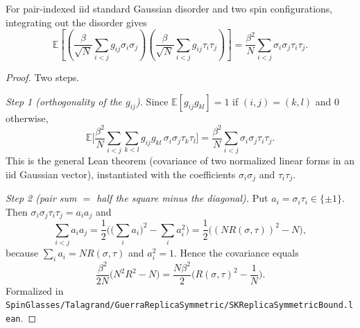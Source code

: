 \begin{lemma}\label{lem:sg-tal:pair-covariance}
  \leanok
{}
For pair-indexed iid standard Gaussian disorder and two spin configurations, integrating out the
disorder gives
\[
\mathbb{E}\left[\left(\frac{\beta}{\sqrt{N}}\sum_{i<j}
  g_{ij}\sigma_i\sigma_j\right)
  \left(\frac{\beta}{\sqrt{N}}\sum_{i<j}
  g_{ij}\tau_i\tau_j\right)\right]
= \frac{\beta^2}{N}\sum_{i<j}\sigma_i\sigma_j\tau_i\tau_j.
\]
\end{lemma}
\begin{proof}
  \leanok
Two steps.

\emph{Step 1 (orthogonality of the $g_{ij}$).} Since $\mathbb{E}[g_{ij}g_{kl}]=1$ if $(i,j)=(k,l)$ and $0$ otherwise,
\[
\mathbb{E}\Big[\frac{\beta^2}{N}\sum_{i<j}\sum_{k<l} g_{ij}g_{kl}\,\sigma_i\sigma_j\tau_k\tau_l\Big]
=\frac{\beta^2}{N}\sum_{i<j}\sigma_i\sigma_j\tau_i\tau_j .
\]
This is the general Lean theorem (covariance of two normalized linear forms in an iid Gaussian vector), instantiated with the coefficients $\sigma_i\sigma_j$ and $\tau_i\tau_j$.

\emph{Step 2 (pair sum $=$ half the square minus the diagonal).} Put $a_i=\sigma_i\tau_i\in\{\pm1\}$. Then $\sigma_i\sigma_j\tau_i\tau_j=a_ia_j$ and
\[
\sum_{i<j}a_ia_j=\frac12\Big(\big(\textstyle\sum_i a_i\big)^2-\sum_i a_i^2\Big)
=\frac12\big((N R(\sigma,\tau))^2-N\big),
\]
because $\sum_ia_i=N R(\sigma,\tau)$ and $a_i^2=1$. Hence the covariance equals
\[
\frac{\beta^2}{2N}\big(N^2R^2-N\big)=\frac{N\beta^2}{2}\Big(R(\sigma,\tau)^2-\frac1N\Big).
\]
Formalized in \texttt{SpinGlasses/Talagrand/GuerraReplicaSymmetric/SKReplicaSymmetricBound.lean}.
\end{proof}

